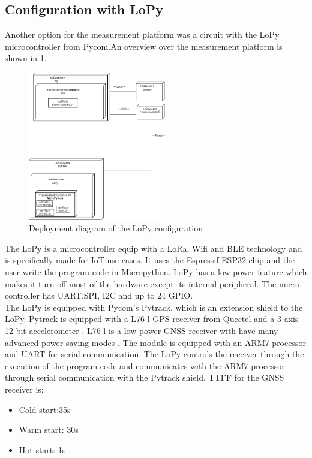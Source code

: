 \subsection{Configuration with LoPy}
Another option for the measurement platform was a circuit with the LoPy microcontroller from Pycom.An overview over the measurement platform is shown in \ref{fig:LoPy_deploy}. 

\begin{figure}[H]
\centering
\includegraphics[height=6.5cm]{Project_Report/Images/LoPy_deploy.png}
\caption{Deployment diagram of the LoPy configuration}
\label{fig:LoPy_deploy}
\end{figure}

The LoPy is a microcontroller equip with a LoRa, Wifi and BLE technology \cite{LoPy} and is specifically made for IoT use cases. It uses the Espressif ESP32 chip and the user write the program code in Micropython. LoPy has a low-power feature which makes it turn off most of the hardware except its internal peripheral. The micro controller has UART,SPI, I2C and up to 24 GPIO.\\ The LoPy is equipped with Pycom's Pytrack, which is an extension shield to the LoPy. Pytrack is equipped with a L76-l GPS receiver from Quectel and a 3 axis 12 bit accelerometer \cite{Pytrack}. L76-l is a low power GNSS receiver with have many advanced power saving modes \cite{L76}. The module is equipped with an ARM7 processor and UART for serial communication. The LoPy controls the receiver through the execution of the program code and communicates with the ARM7 processor through serial communication with the Pytrack shield. TTFF for the GNSS receiver is:
\begin{itemize}
\item Cold start:35s
\item Warm start: 30s
\item Hot start: 1s


\end{itemize}


